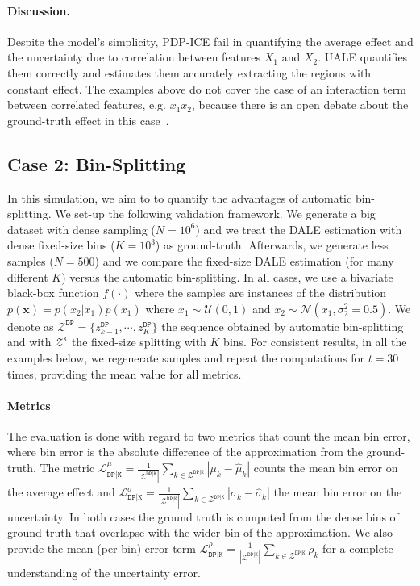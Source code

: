 \documentclass[twoside]{article}
\begin{document}
\paragraph{Discussion.}

Despite the model's simplicity, PDP-ICE fail in quantifying the
average effect and the uncertainty due to correlation between features
\(X_1\) and \(X_2\). UALE quantifies them correctly and estimates them
accurately extracting the regions with constant effect. The examples
above do not cover the case of an interaction term between correlated
features, e.g. \(x_1x_2\), because there is an open debate about the
ground-truth effect in this case~\citep{Gromping2020MAEP}.

\subsection{Case 2: Bin-Splitting}
\label{sec:simulation-examples-2}

In this simulation, we aim to to quantify the advantages of automatic
bin-splitting. We set-up the following validation framework. We
generate a big dataset with dense sampling (\(N=10^6\)) and we treat
the DALE estimation with dense fixed-size bins (\(K=10^3\)) as
ground-truth. Afterwards, we generate less samples (\(N=500\)) and we
compare the fixed-size DALE estimation (for many different \(K\))
versus the automatic bin-splitting. In all cases, we use a bivariate
black-box function \(f(\cdot)\) where the samples are instances of the
distribution \(p(\mathbf{x}) = p(x_2|x_1)p(x_1)\) where
\(x_1 \sim \mathcal{U}(0,1)\) and
\(x_2 \sim \mathcal{N}(x_1, \sigma_2^2=0.5)\). We denote as
\(\mathcal{Z^{\mathtt{DP}}} = \{z^{\mathtt{DP}}_{k-1}, \cdots,
z^{\mathtt{DP}}_{K}\}\) the sequence obtained by automatic
bin-splitting and with \(\mathcal{Z^{\mathtt{K}}}\) the fixed-size
splitting with \(K\) bins.  For consistent results, in all the
examples below, we regenerate samples and repeat the computations for
\(t = 30\) times, providing the mean value for all metrics.

\paragraph{Metrics}

The evaluation is done with regard to two metrics that count the mean
bin error, where bin error is the absolute difference of the
approximation from the ground-truth. The metric
\(\mathcal{L}_{\mathtt{DP|K}}^{\mu} =
\frac{1}{|\mathcal{Z}^{\mathtt{DP|K}}|} \sum_{k \in
  \mathcal{Z}^{\mathtt{DP|K}}} | \mu_k - \hat{\mu}_k | \) counts the
mean bin error on the average effect and
\(\mathcal{L}_{\mathtt{DP|K}}^{\sigma} =
\frac{1}{|\mathcal{Z}^{\mathtt{DP|K}}|} \sum_{k \in
  \mathcal{Z}^{\mathtt{DP|K}}} | \sigma_k - \hat{\sigma}_k | \) the
mean bin error on the uncertainty. In both cases the ground truth is
computed from the dense bins of ground-truth that overlapse with the
wider bin of the approximation. We also provide the mean (per bin)
error term
\(\mathcal{L}^{\rho}_{\mathtt{DP|K}} =
\frac{1}{|\mathcal{Z}^{\mathtt{DP|K}}|} \sum_{k \in
  \mathcal{Z}^{\mathtt{DP|K}}} \rho_k \) for a complete understanding
of the uncertainty error. 
\end{document}
